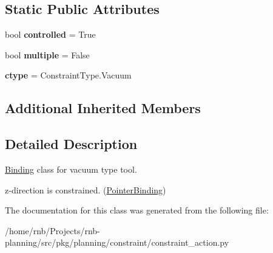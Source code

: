 \subsection*{Static Public Attributes}
\begin{DoxyCompactItemize}
\item 
\mbox{\label{classrnb-planning_1_1src_1_1pkg_1_1planning_1_1constraint_1_1constraint__action_1_1_vacuum_tool_a4572dd284b8111e0b2113376ad142ce1}} 
bool {\bfseries controlled} = True
\item 
\mbox{\label{classrnb-planning_1_1src_1_1pkg_1_1planning_1_1constraint_1_1constraint__action_1_1_vacuum_tool_ac995953e97f401aafb648f47ebbba877}} 
bool {\bfseries multiple} = False
\item 
\mbox{\label{classrnb-planning_1_1src_1_1pkg_1_1planning_1_1constraint_1_1constraint__action_1_1_vacuum_tool_a8a327077662b8c64ca1e1d6beeb9f622}} 
{\bfseries ctype} = Constraint\+Type.\+Vacuum
\end{DoxyCompactItemize}
\subsection*{Additional Inherited Members}


\subsection{Detailed Description}
\hyperlink{classrnb-planning_1_1src_1_1pkg_1_1planning_1_1constraint_1_1constraint__action_1_1_binding}{Binding} class for vacuum type tool. 

z-\/direction is constrained. (\hyperlink{classrnb-planning_1_1src_1_1pkg_1_1planning_1_1constraint_1_1constraint__action_1_1_pointer_binding}{Pointer\+Binding}) 

The documentation for this class was generated from the following file\+:\begin{DoxyCompactItemize}
\item 
/home/rnb/\+Projects/rnb-\/planning/src/pkg/planning/constraint/constraint\+\_\+action.\+py\end{DoxyCompactItemize}
